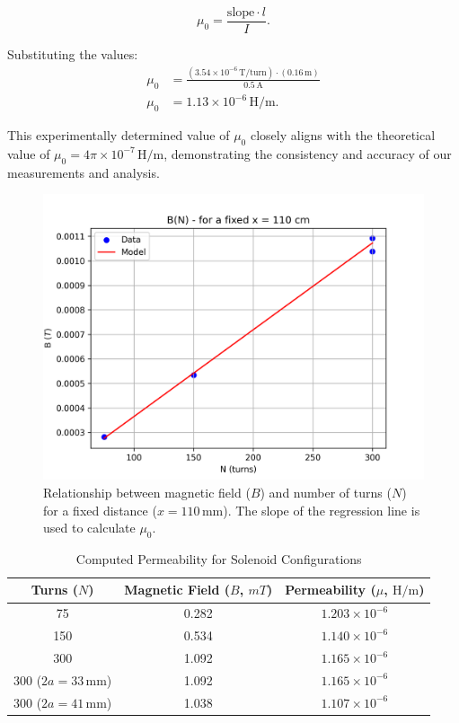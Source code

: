 \documentclass[journal]{IEEEtran}
\begin{document}
    \begin{equation}
        \mu_0 = \frac{\text{slope} \cdot l}{I}.
    \end{equation}
    
    Substituting the values:
    \begin{align*}
        \mu_0 &= \frac{(3.54 \times 10^{-6} \, \text{T/turn}) \cdot (0.16 \, \text{m})}{0.5 \, \text{A}} \\
        \mu_0 &= 1.13 \times 10^{-6} \, \text{H/m}.
    \end{align*}
    
    This experimentally determined value of \( \mu_0 \) closely aligns with the theoretical value of \( \mu_0 = 4\pi \times 10^{-7} \, \mathrm{H/m} \), demonstrating the consistency and accuracy of our measurements and analysis.
    
    \begin{figure}[H]
    \centering
    \includegraphics[width=\linewidth]{output_plots/B_vs_n_110cm.png}
    \caption{Relationship between magnetic field (\( B \)) and number of turns (\( N \)) for a fixed distance (\( x = 110 \, \text{mm} \)). The slope of the regression line is used to calculate \( \mu_0 \).}
    \label{fig:b_vs_turns}
    \end{figure}
    
    \begin{table}[H]
    \centering
    \caption{Computed Permeability for Solenoid Configurations}
    \label{tab:computed_mu}
    \begin{tabular}{ccc}
    \toprule
    Turns (\( N \)) & Magnetic Field (\( B \), \( mT \)) & Permeability (\( \mu \), \( \text{H/m} \)) \\
    \midrule
    75   & 0.282 & \( 1.203 \times 10^{-6} \) \\
    150  & 0.534 & \( 1.140 \times 10^{-6} \) \\
    300  & 1.092 & \( 1.165 \times 10^{-6} \) \\
    300 (\( 2a = 33 \, \text{mm} \)) & 1.092 & \( 1.165 \times 10^{-6} \) \\
    300 (\( 2a = 41 \, \text{mm} \)) & 1.038 & \( 1.107 \times 10^{-6} \) \\
    \bottomrule
    \end{tabular}
    \end{table}
    
\end{document}
